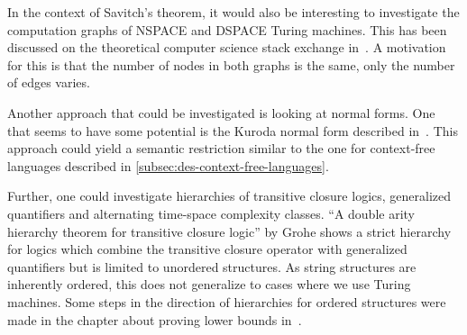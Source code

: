 In the context of Savitch's theorem, it would also be interesting to investigate the computation graphs of \acs{NSPACE} and \acs{DSPACE} Turing machines.
This has been discussed on the theoretical computer science stack exchange in~\cite{Barak2010}.
A motivation for this is that the number of nodes in both graphs is the same, only the number of edges varies.

Another approach that could be investigated is looking at normal forms.
One that seems to have some potential is the Kuroda normal form described in~\cite{Kuroda1964}.
This approach could yield a semantic restriction similar to the one for context-free languages described in \cref{subsec:des-context-free-languages}.

Further, one could investigate hierarchies of transitive closure logics, generalized quantifiers and alternating time-space complexity classes.
``A double arity hierarchy theorem for transitive closure logic''\cite{Grohe1996} by Grohe shows a strict hierarchy for logics which combine the transitive closure operator with generalized quantifiers but is limited to unordered structures.
As string structures are inherently ordered, this does not generalize to cases where we use Turing machines.
Some steps in the direction of hierarchies for ordered structures were made in the chapter about proving lower bounds in~\cite{descriptive-complexity}.